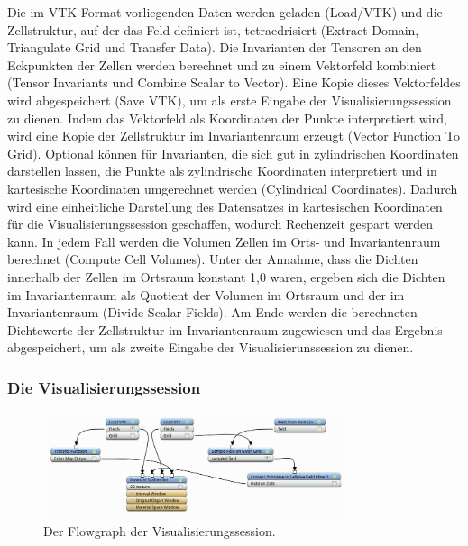 \documentclass[a4paper,fontsize=12pt,toc=bib,parskip=half,ngerman]{scrartcl}
\begin{document}
Die im VTK Format\cite{avila2010vtk} vorliegenden Daten werden geladen (\glq Load/VTK\grq{}) und die Zellstruktur, auf der das Feld definiert ist, tetraedrisiert (\glq Extract Domain\grq{}, \glq Triangulate Grid\grq{} und \glq Transfer Data\grq{}). Die Invarianten der Tensoren an den Eckpunkten der Zellen werden berechnet und zu einem Vektorfeld kombiniert (\glq Tensor Invariants\grq{} und \glq Combine Scalar to Vector\grq{}). Eine Kopie dieses Vektorfeldes wird abgespeichert (\glq Save VTK\grq{}), um als erste Eingabe der Visualisierungssession zu dienen. Indem das Vektorfeld als Koordinaten der Punkte interpretiert wird, wird eine Kopie der Zellstruktur im Invariantenraum erzeugt (\glq Vector Function To Grid\grq{}). Optional k\"onnen f\"ur Invarianten, die sich gut in zylindrischen Koordinaten darstellen lassen, die Punkte als zylindrische Koordinaten interpretiert und in kartesische Koordinaten umgerechnet werden (\glq Cylindrical Coordinates\grq{}). Dadurch wird eine einheitliche Darstellung des Datensatzes in kartesischen Koordinaten f\"ur die Visualisierungssession geschaffen, wodurch Rechenzeit gespart werden kann. In jedem Fall werden die Volumen Zellen im Orts- und Invariantenraum berechnet (\glq Compute Cell Volumes\grq{}). Unter der Annahme, dass die Dichten innerhalb der Zellen im Ortsraum konstant 1,0 waren, ergeben sich die Dichten im Invariantenraum als Quotient der Volumen im Ortsraum und der im Invariantenraum (\glq Divide Scalar Fields\grq{}). Am Ende werden die berechneten Dichtewerte der Zellstruktur im Invariantenraum zugewiesen und das Ergebnis abgespeichert, um als zweite Eingabe der Visualisierunssession zu dienen.

\subsubsection{Die Visualisierungssession}
\begin{figure}
	\centering
	\includegraphics[width=0.8\textwidth]{pictures/VisSession.png}
	\caption{Der Flowgraph der Visualisierungssession.}
	\label{VisualizationSession}
\end{figure}
\end{document}
